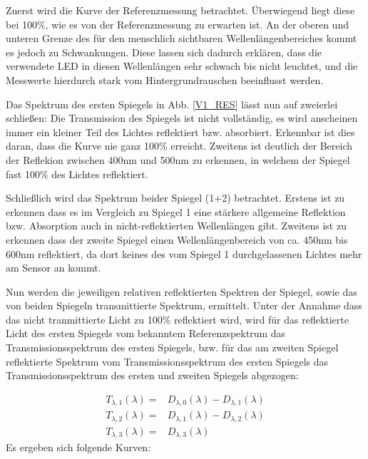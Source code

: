 \label{V1_AUSW}

Zuerst wird die Kurve der Referenzmessung betrachtet. Überwiegend liegt diese bei 100\%, wie es von der Referenzmessung zu erwarten ist. An der oberen und unteren Grenze des für den menschlich sichtbaren Wellenlängenbereiches kommt es jedoch zu Schwankungen. Diese lassen sich dadurch erklären, dass die verwendete LED in diesen Wellenlängen sehr schwach bis nicht leuchtet, und die Messwerte hierdurch stark vom Hintergrundrauschen beeinflusst werden. 

Das Spektrum des ersten Spiegels in Abb. \ref{V1_RES} lässt nun auf zweierlei schließen:
Die Transmission des Spiegels ist nicht vollständig, es wird anscheinen immer ein kleiner Teil des Lichtes reflektiert bzw. absorbiert. Erkennbar ist dies daran, dass die Kurve nie ganz 100\% erreicht. Zweitens ist deutlich der Bereich der Reflekion zwischen 400nm und 500nm zu erkennen, in welchem der Spiegel fast 100\% des Lichtes reflektiert. 

Schließlich wird das Spektrum beider Spiegel (1+2) betrachtet. Erstens ist zu erkennen dass es im Vergleich zu Spiegel 1 eine stärkere allgemeine Reflektion bzw. Absorption auch in nicht-reflektierten Wellenlängen gibt. Zweitens ist zu erkennen dass der zweite Spiegel einen Wellenlängenbereich von ca. 450nm bis 600nm reflektiert, da dort keines des vom Spiegel 1 durchgelassenen Lichtes mehr am Sensor an kommt.

Nun werden die jeweiligen relativen reflektierten Spektren der Spiegel, sowie das von beiden Spiegeln transmittierte Spektrum, ermittelt. Unter der Annahme dass das nicht tranmittierte Licht zu 100\% reflektiert wird, wird für das reflektierte Licht des ersten Spiegels vom bekanntem Referenzspektrum das Transmissionsspektrum des ersten Spiegels, bzw. für das am zweiten Spiegel reflektierte Spektrum vom Transmissionsspektrum des ersten Spiegels das Transmissionsspektrum des ersten und zweiten Spiegels abgezogen:

\begin{eqnarray*}
	T_{\lambda, 1}(\lambda) = & D_{\lambda,0}(\lambda) - D_{\lambda,1}(\lambda) \\
	T_{\lambda, 2}(\lambda) = & D_{\lambda,1}(\lambda) - D_{\lambda,2}(\lambda) \\
	T_{\lambda, 3}(\lambda) = & D_{\lambda,3}(\lambda)
\end{eqnarray*}
Es ergeben sich folgende Kurven:

